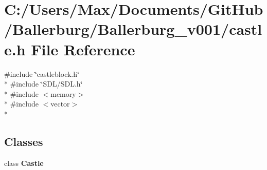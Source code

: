 \section{C\+:/\+Users/\+Max/\+Documents/\+Git\+Hub/\+Ballerburg/\+Ballerburg\+\_\+v001/castle.h File Reference}
\label{castle_8h}
{\ttfamily \#include \char`\"{}castleblock.\+h\char`\"{}}\\*
{\ttfamily \#include \char`\"{}S\+D\+L/\+S\+D\+L.\+h\char`\"{}}\\*
{\ttfamily \#include $<$memory$>$}\\*
{\ttfamily \#include $<$vector$>$}\\*
\subsection*{Classes}
\begin{DoxyCompactItemize}
\item 
class {\bf Castle}
\end{DoxyCompactItemize}
